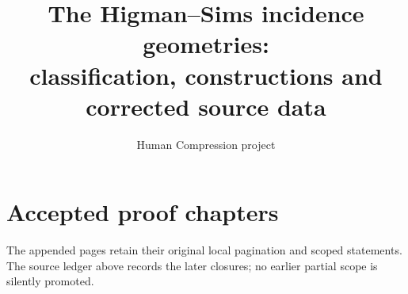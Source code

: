 \documentclass[11pt,a4paper]{article}
\title{The Higman--Sims incidence geometries:\\classification, constructions and corrected source data}
\author{Human Compression project}
\date{}
\begin{document}
\maketitle

\clearpage
\appendix
\section{Accepted proof chapters}
The appended pages retain their original local pagination and scoped statements. The source ledger above records the later closures; no earlier partial scope is silently promoted.
















\end{document}
